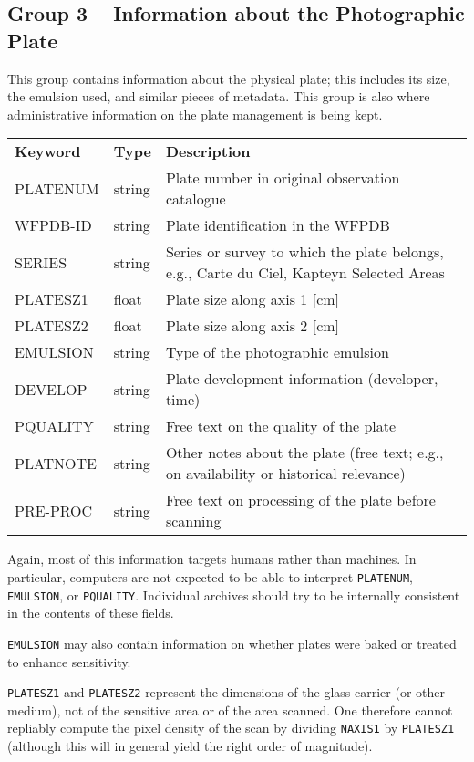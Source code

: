\documentclass[11pt]{ivoa}
\newcommand\cardname[1]{\texttt{\color{keyword}#1}}
\begin{document}
\subsection{Group 3 – Information about the Photographic Plate}

This group contains information about the physical plate; this includes
its size, the emulsion used, and similar pieces of metadata.  This group
is also where administrative information on the plate management is
being kept.

\begin{inlinetable}
\footnotesize
\begin{tabular}{llp{}}
\sptablerule
\textbf{Keyword}&\textbf{Type}&\textbf{Description}\\
\sptablerule
PLATENUM &string &Plate number in original observation
catalogue\\
WFPDB-ID &string &Plate identification in the WFPDB\\
SERIES   &string &Series or survey to which the plate belongs,
e.g., Carte du Ciel, Kapteyn Selected Areas\\
PLATESZ1 &float  &Plate size along axis 1 [cm]\\
PLATESZ2 &float  &Plate size along axis 2 [cm]\\
EMULSION &string &Type of the photographic emulsion\\
DEVELOP  &string &Plate development information (developer,
time)\\
PQUALITY &string &Free text on the quality of the plate\\
PLATNOTE &string &Other notes about the plate (free text; e.g., on
availability or historical relevance)\\
PRE-PROC  &string &Free text on processing of the plate before
scanning\\
\end{tabular}
\end{inlinetable}

Again, most of this information targets humans rather than machines.  In
particular, computers are not expected to be able to interpret
\cardname{PLATENUM}, \cardname{EMULSION}, or \cardname{PQUALITY}.
Individual archives should try to be internally consistent in the
contents of these fields.

\cardname{EMULSION} may also contain information on whether plates
were baked or treated to enhance sensitivity.

\cardname{PLATESZ1} and \cardname{PLATESZ2} represent the dimensions of
the glass carrier (or other medium), not of the sensitive area or of the area scanned.
One therefore cannot repliably compute the pixel density of the scan by
dividing \cardname{NAXIS1} by \cardname{PLATESZ1} (although this will in
general yield the right order of magnitude).
\end{document}
